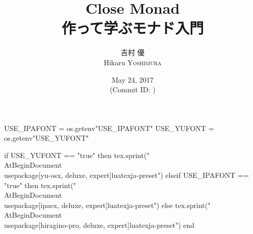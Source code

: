 \hypersetup{colorlinks,linkcolor=,urlcolor=links}

\beamertemplatenavigationsymbolsempty


\usepackage{luacode}
\usepackage{luatexja}
\usepackage{pgfpages}

\begin{luacode*}
  USE_IPAFONT = os.getenv"USE_IPAFONT"
  USE_YUFONT = os.getenv"USE_YUFONT"
  
  if USE_YUFONT == "true" then
    tex.sprint("\\AtBeginDocument{\\usepackage[yu-osx, deluxe, expert]{luatexja-preset}}")
  elseif USE_IPAFONT == "true" then
    tex.sprint("\\AtBeginDocument{\\usepackage[ipaex, deluxe, expert]{luatexja-preset}}")
  else
    tex.sprint("\\AtBeginDocument{\\usepackage[hiragino-pro, deluxe, expert]{luatexja-preset}}")
  end
\end{luacode*}

\usepackage{epigraph}
\usepackage{etoolbox}
\usepackage{tikz}
\usepackage{framed}
\usepackage{libertine}
\usepackage{amsmath}
\usepackage{mathtools}
\usepackage{listings}
\usepackage{tikz-qtree}

\renewcommand{\kanjifamilydefault}{\gtdefault}


\setmainfont[Ligatures=TeX]{Linux Libertine O}
\setsansfont[Ligatures=TeX]{CMU Sans Serif}
\setmonofont[Ligatures=TeX]{CMU Typewriter Text}



\title[Close Monad]{%
  {\LARGE Close Monad}\\
  {\normalsize 作って学ぶモナド入門}
}
\author[吉村 優]{吉村 優 \\ Hikaru \textsc{Yoshimura}}
\date[May 24, 2017]{%
  May 24, 2017 \\%
  {\footnotesize (Commit ID: \GITAbrHash)}
}






